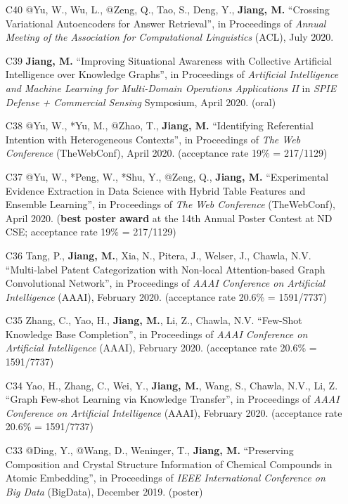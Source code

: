 \documentclass[10pt]{article}
\newenvironment{myindentpar}[1]%
{\begin{list}{}%
         {\setlength{\leftmargin}{#1}}%
         \item[]%
}
{\end{list}}
\newcounter{list}
\begin{document}
\begin{myindentpar}{0.00cm}
\begin{enumerate}[leftmargin=.5cm]
\item[C40] @Yu, W., Wu, L., @Zeng, Q., Tao, S., Deng, Y., \textbf{Jiang, M.} ``Crossing Variational Autoencoders for Answer Retrieval'', in Proceedings of \textit{Annual Meeting of the Association for Computational Linguistics} (ACL), July 2020.

\item[C39] \textbf{Jiang, M.} ``Improving Situational Awareness with Collective Artificial Intelligence over Knowledge Graphs'', in Proceedings of \textit{Artificial Intelligence and Machine Learning for Multi-Domain Operations Applications II} in \textit{SPIE Defense + Commercial Sensing} Symposium, April 2020. (oral)

\item[C38] @Yu, W., *Yu, M., @Zhao, T., \textbf{Jiang, M.} ``Identifying Referential Intention with Heterogeneous Contexts'', in Proceedings of \textit{The Web Conference} (TheWebConf), April 2020. (acceptance rate 19\% = 217/1129)

\item[C37] @Yu, W., *Peng, W., *Shu, Y., @Zeng, Q., \textbf{Jiang, M.} ``Experimental Evidence Extraction in Data Science with Hybrid Table Features and Ensemble Learning'', in Proceedings of \textit{The Web Conference} (TheWebConf), April 2020. (\textbf{best poster award} at the 14th Annual Poster Contest at ND CSE; acceptance rate 19\% = 217/1129)

\item[C36] Tang, P., \textbf{Jiang, M.}, Xia, N., Pitera, J., Welser, J., Chawla, N.V. ``Multi-label Patent Categorization with Non-local Attention-based Graph Convolutional Network'', in Proceedings of \textit{AAAI Conference on Artificial Intelligence} (AAAI), February 2020. (acceptance rate 20.6\% = 1591/7737)
	
\item[C35] Zhang, C., Yao, H., \textbf{Jiang, M.}, Li, Z., Chawla, N.V. ``Few-Shot Knowledge Base Completion'', in Proceedings of \textit{AAAI Conference on Artificial Intelligence} (AAAI), February 2020. (acceptance rate 20.6\% = 1591/7737)

\item[C34] Yao, H., Zhang, C., Wei, Y., \textbf{Jiang, M.}, Wang, S., Chawla, N.V., Li, Z. ``Graph Few-shot Learning via Knowledge Transfer'', in Proceedings of \textit{AAAI Conference on Artificial Intelligence} (AAAI), February 2020. (acceptance rate 20.6\% = 1591/7737)

\item[C33] @Ding, Y., @Wang, D., Weninger, T., \textbf{Jiang, M.} ``Preserving Composition and Crystal Structure Information of Chemical Compounds in Atomic Embedding'', in Proceedings of \textit{IEEE International Conference on Big Data} (BigData), December 2019. (poster)


\end{enumerate}
\end{myindentpar}
\end{document}
